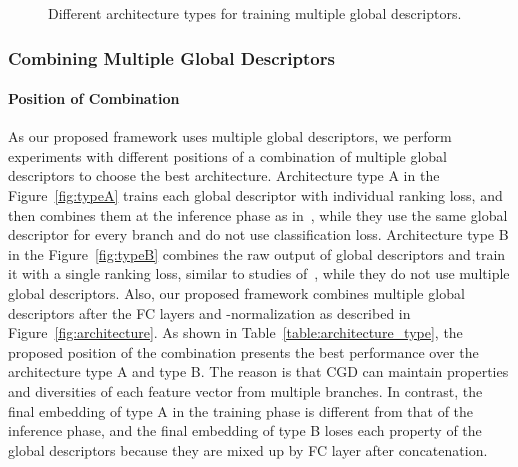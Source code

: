 \documentclass[10pt,twocolumn,letterpaper]{article}
\begin{document}
\begin{CJK}{UTF8}{mj}
\begin{figure}[t!]
\begin{center}
\vspace{0.1em}
\end{center}
   \caption{Different architecture types for training multiple global descriptors.}
\label{fig:architecture_type}
\vspace{-0.3em}
\end{figure}

\subsubsection{Combining Multiple Global Descriptors}

\paragraph{Position of Combination} \label{sec:position_of_combination}
As our proposed framework uses multiple global descriptors, we perform experiments with different positions of a combination of multiple global descriptors to choose the best architecture.
Architecture type A in the Figure~\ref{fig:typeA} trains each global descriptor with individual ranking loss, and then combines them at the inference phase as in~\cite{Kim_2018_ECCV}, while they use the same global descriptor for every branch and do not use classification loss.
Architecture type B in the Figure~\ref{fig:typeB} combines the raw output of global descriptors and train it with a single ranking loss, similar to studies of~\cite{shen2017learning, suvisual}, while they do not use multiple global descriptors.
Also, our proposed framework combines multiple global descriptors after the FC layers and -normalization as described in Figure~\ref{fig:architecture}.
As shown in Table~\ref{table:architecture_type}, the proposed position of the combination presents the best performance over the architecture type A and type B.
The reason is that CGD can maintain properties and diversities of each feature vector from multiple branches.
In contrast, the final embedding of type A in the training phase is different from that of the inference phase, and the final embedding of type B loses each property of the global descriptors because they are mixed up by FC layer after concatenation.


\end{CJK}
\end{document}
